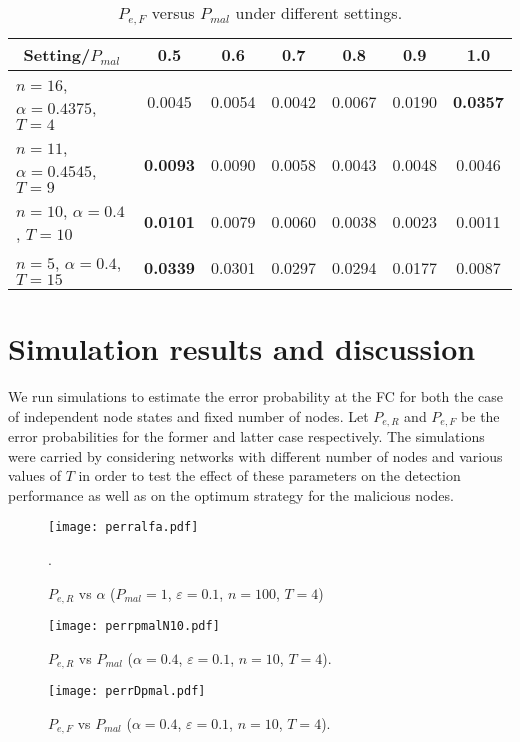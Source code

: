 \documentclass[10pt,peerreview,draftcls,onecolumn]{IEEEtran}
\begin{document}
\begin{table*}[t!]
\small
\centering
\renewcommand{\arraystretch}{1.1}

\begin{tabular}{c| c c c c c c|}
\hline
\multicolumn{1}{|c|}{Setting/$P_{mal}$} &0.5   &0.6   &0.7   &0.8   &0.9   &1.0   \\ \hline
\multicolumn{1}{|l|}{$n=16$, $\alpha=0.4375$, $T=4$}  &0.0045  &0.0054  &0.0042  &0.0067  &0.0190  &{\bf 0.0357}\\ \hline
\multicolumn{1}{|l|}{$n=11$, $\alpha=0.4545$, $T=9$} &{\bf 0.0093} &0.0090  &0.0058  &0.0043  &0.0048  &0.0046\\ \hline
\multicolumn{1}{|l|}{$n=10$, $\alpha=0.4$, $T=10$}  &{\bf 0.0101}  &0.0079  &0.0060  &0.0038  &0.0023  &0.0011\\ \hline
\multicolumn{1}{|l|}{$n=5$, $\alpha=0.4$, $T=15$} &{\bf 0.0339}  &0.0301  &0.0297  &0.0294  &0.0177  &0.0087\\ \hline
\end{tabular}
\caption{$P_{e,F}$ versus $P_{mal}$ under different settings.}
\label{tab.DetTable}
\end{table*}

\section{Simulation results and discussion}
\label{sec.simul}

We run simulations to estimate the error probability at the FC for both the case of independent node states and fixed number of nodes. Let $P_{e,R}$ and $P_{e,F}$ be the error probabilities for the former and latter case respectively.
The simulations were carried by considering networks with different number of nodes and various values of $T$ in order to test the effect of these parameters on the detection performance as well as on the optimum strategy for the malicious nodes.
\begin{figure}[t!]
\centering
\texttt{[image: perralfa.pdf]}
    \caption{$P_{e,R}$ vs $\alpha$ ($P_{mal}=1$, $\varepsilon = 0.1$, $n=100$, $T=4$) \vspace{-0.7cm}}.
    \label{fig.perralfa}
\end{figure}
\begin{figure}[t!]
\centering
\texttt{[image: perrpmalN10.pdf]}
    \caption{$P_{e,R}$ vs $P_{mal}$ ($\alpha=0.4$, $\varepsilon = 0.1$, $n=10$, $T = 4$).\vspace{-0.5cm}}
    \label{fig.perrpmalN10}
\end{figure}
\begin{figure}[t!]
\centering
\texttt{[image: perrDpmal.pdf]}
    \caption{$P_{e,F}$ vs $P_{mal}$ ($\alpha=0.4$, $\varepsilon = 0.1$, $n=10$, $T = 4$).\vspace{-0.5cm}}
    \label{fig.perrDpmal}
\end{figure}
\end{document}
